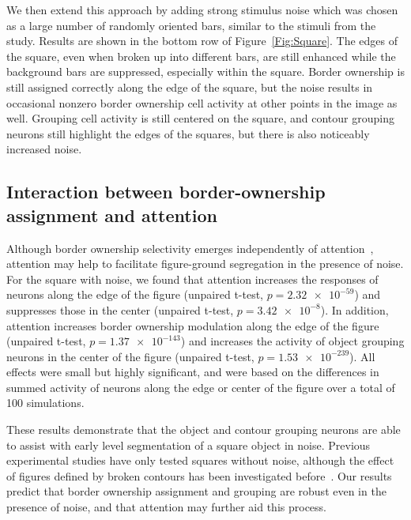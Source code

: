 We then extend this approach by adding strong stimulus noise which was
chosen as a large number of randomly oriented bars, similar to the
stimuli from the~\cite{Chen_etal14} study. Results are shown in
the bottom row of Figure~\ref{Fig:Square}. The edges of the
square, even when broken up into different bars, are still enhanced
while the background bars are suppressed, especially within the
square.  Border ownership is still assigned correctly along the edge
of the square, but the noise results in occasional nonzero border
ownership cell activity at other points in the image as well. Grouping
cell activity is still centered on the square, and contour grouping
neurons still highlight the edges of the squares, but there is also
noticeably increased noise.

\subsection{Interaction between border-ownership assignment and attention} 
\label{sec:BOS-att}

Although border ownership selectivity emerges independently of
attention~\citep{Qiu_etal07}, attention may help to facilitate
figure-ground segregation in the presence of noise.  For the square
with noise, we found that attention increases the responses of neurons
along the edge of the figure (unpaired t-test, $p=\num{2.32e-59}$) and
suppresses those in the center (unpaired t-test,
$p=\num{3.42e-8}$). In addition, attention increases border ownership
modulation along the edge of the figure (unpaired t-test,
$p=\num{1.37e-143}$) and increases the activity of object grouping
neurons in the center of the figure (unpaired t-test,
$p=\num{1.53e-239}$). All effects were small but highly significant,
and were based on the differences in summed activity of neurons along
the edge or center of the figure over a total of 100 simulations.

These results demonstrate that the object and contour grouping neurons
are able to assist with early level segmentation of a square object in
noise.  Previous experimental studies have only tested squares without
noise, although the effect of figures defined by broken contours has
been investigated before~\citep{Zhang_vonderHeydt10}.  Our results predict
that border ownership assignment and grouping are robust even in the
presence of noise, and that attention may further aid this process.


